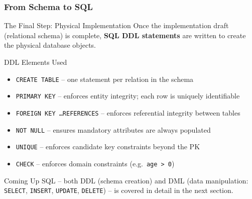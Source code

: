 \begin{frame}
  \frametitle{From Schema to SQL}

  \begin{block}{The Final Step: Physical Implementation}
    Once the implementation draft (relational schema) is complete, \textbf{SQL DDL statements} are written to create the physical database objects.
  \end{block}

  \begin{block}{DDL Elements Used}
    \begin{itemize}
      \item \texttt{CREATE TABLE} -- one statement per relation in the schema
      \item \texttt{PRIMARY KEY} -- enforces entity integrity; each row is uniquely identifiable
      \item \texttt{FOREIGN KEY \ldots REFERENCES} -- enforces referential integrity between tables
      \item \texttt{NOT NULL} -- ensures mandatory attributes are always populated
      \item \texttt{UNIQUE} -- enforces candidate key constraints beyond the PK
      \item \texttt{CHECK} -- enforces domain constraints (e.g.\ \texttt{age > 0})
    \end{itemize}
  \end{block}

  \begin{alertblock}{Coming Up}
    SQL -- both DDL (schema creation) and DML (data manipulation: \texttt{SELECT}, \texttt{INSERT}, \texttt{UPDATE}, \texttt{DELETE}) -- is covered in detail in the next section.
  \end{alertblock}
\end{frame}


